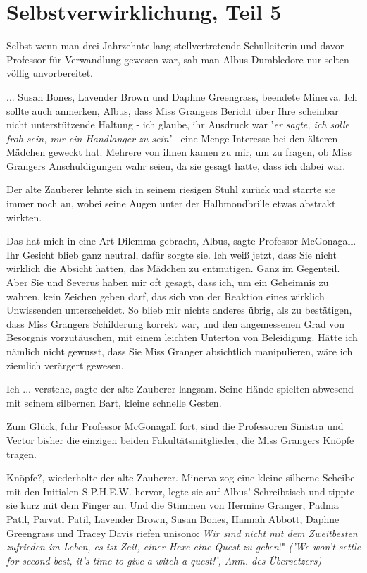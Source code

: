 \chapter{Selbstverwirklichung, Teil 5}

Selbst wenn man drei Jahrzehnte lang stellvertretende Schulleiterin und davor
Professor für Verwandlung gewesen war, sah man Albus Dumbledore nur selten
völlig unvorbereitet.

\glqq ... Susan Bones, Lavender Brown und Daphne Greengrass\grqq{}, beendete
Minerva. \glqq Ich sollte auch anmerken, Albus, dass Miss Grangers Bericht über
Ihre scheinbar nicht unterstützende Haltung - ich glaube, ihr Ausdruck war
'\emph{er sagte, ich solle froh sein, nur ein Handlanger zu sein'} - eine Menge
Interesse bei den älteren Mädchen geweckt hat. Mehrere von ihnen kamen zu mir,
um zu fragen, ob Miss Grangers Anschuldigungen wahr seien, da sie gesagt hatte,
dass ich dabei war.\grqq{}

Der alte Zauberer lehnte sich in seinem riesigen Stuhl zurück und starrte sie
immer noch an, wobei seine Augen unter der Halbmondbrille etwas abstrakt
wirkten.

\glqq Das hat mich in eine Art Dilemma gebracht, Albus\grqq{}, sagte Professor
McGonagall. Ihr Gesicht blieb ganz neutral, dafür sorgte sie. \glqq Ich weiß
jetzt, dass Sie nicht wirklich die Absicht hatten, das Mädchen zu entmutigen.
Ganz im Gegenteil. Aber Sie und Severus haben mir oft gesagt, dass ich, um ein
Geheimnis zu wahren, kein Zeichen geben darf, das sich von der Reaktion eines
wirklich Unwissenden unterscheidet. So blieb mir nichts anderes übrig, als zu
bestätigen, dass Miss Grangers Schilderung korrekt war, und den angemessenen
Grad von Besorgnis vorzutäuschen, mit einem leichten Unterton von Beleidigung.
Hätte ich nämlich nicht gewusst, dass Sie Miss Granger absichtlich manipulieren,
wäre ich ziemlich verärgert gewesen.\grqq{}

\glqq Ich ... verstehe\grqq{}, sagte der alte Zauberer langsam. Seine Hände
spielten abwesend mit seinem silbernen Bart, kleine schnelle Gesten.

\glqq Zum Glück\grqq{}, fuhr Professor McGonagall fort, \glqq sind die
Professoren Sinistra und Vector bisher die einzigen beiden Fakultätsmitglieder,
die Miss Grangers Knöpfe tragen.\grqq{}

\glqq Knöpfe?\grqq{}, wiederholte der alte Zauberer. Minerva zog eine kleine
silberne Scheibe mit den Initialen S.P.H.E.W. hervor, legte sie auf Albus'
Schreibtisch und tippte sie kurz mit dem Finger an. Und die Stimmen von Hermine
Granger, Padma Patil, Parvati Patil, Lavender Brown, Susan Bones, Hannah Abbott,
Daphne Greengrass und Tracey Davis riefen unisono: \glqq \emph{Wir sind nicht
mit dem Zweitbesten zufrieden im Leben, es ist Zeit, einer Hexe eine Quest zu
geben}!" \emph{('We won't settle for second best, it's time to give a witch a
quest!', Anm. des Übersetzers)}


